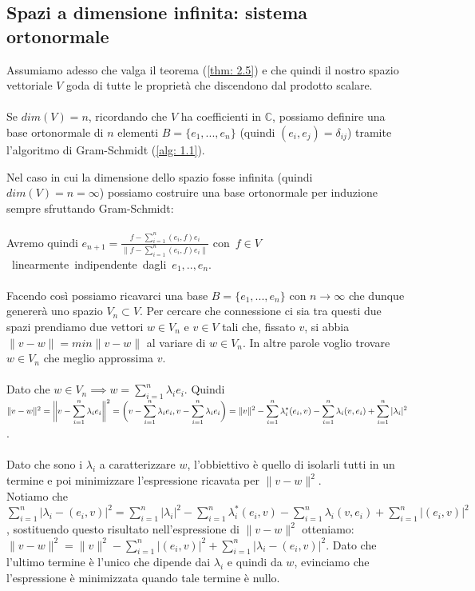 \documentclass[a4paper,12pt]{report}
\begin{document}
\newpage

\subsection{Spazi a dimensione infinita: sistema ortonormale}
Assumiamo adesso che valga il teorema (\ref{thm: 2.5}) e che quindi il nostro spazio vettoriale $V$ goda di tutte le proprietà che discendono dal prodotto scalare.
\\
\\ Se $dim(V)=n$, ricordando che $V$ ha coefficienti in $\mathbb{C}$, possiamo definire una base ortonormale di $n$ elementi $B=\{e_1,...,e_n\}$ (quindi $(e_i,e_j)=\delta_{ij}$) tramite l'algoritmo di Gram-Schmidt (\ref{alg: 1.1}). 

Nel caso in cui la dimensione dello spazio fosse infinita (quindi $dim(V)=n=\infty$) possiamo costruire una base ortonormale per induzione sempre sfruttando Gram-Schmidt:
\\
\\ Avremo quindi $e_{n+1}=\displaystyle\frac{f-\displaystyle\sum_{i=1}^n(e_i,f)e_i}{\bigg\|f-\displaystyle\sum_{i=1}^n(e_i,f)e_i\bigg\|}$ \mbox{con $f\in V$ linearmente indipendente dagli $e_1,..,e_n$}.
\\
\\ Facendo così possiamo ricavarci una base $B=\{e_1,...,e_n\}$ con $n\to \infty$ che dunque genererà uno spazio $V_n \subset V$. Per cercare che connessione ci sia tra questi due spazi prendiamo due vettori $w \in V_n$ e $v \in V$ tali che, fissato $v$, si abbia $\|v-w\|=min\|v-w\|$ al variare di $w\in V_n$. In altre parole voglio trovare $w \in V_n$ che meglio approssima $v$.
\\
\\ Dato che $w \in V_n \implies w=\displaystyle\sum_{i=1}^n\lambda _ie_i$. Quindi $\|v-w\|^2=\bigg\|v-\displaystyle\sum_{i=1}^n\lambda_ie_i\bigg\|^2=
\\\bigg(v-\sum_{i=1}^n\lambda_ie_i,v-\sum_{i=1}^n\lambda_ie_i\bigg)=\|v\|^2-\displaystyle\sum_{i=1}^n\lambda_i^*(e_i,v)-\sum_{i=1}^n\lambda_i(v,e_i)+\sum_{i=1}^n|\lambda_i|^2$.
\\
\\ Dato che sono i $\lambda_i$ a caratterizzare $w$, l'obbiettivo è quello di isolarli tutti in un termine e poi minimizzare l'espressione ricavata per $\|v-w\|^2$.
\\Notiamo che \mbox{$\displaystyle\sum_{i=1}^n|\lambda_i-(e_i,v)|^2=\sum_{i=1}^n|\lambda_i|^2-\sum_{i=1}^n\lambda_i^*(e_i,v)-\sum_{i=1}^n\lambda_i(v,e_i)+\sum_{i=1}^n|(e_i,v)|^2$}, sostituendo questo risultato nell'espressione di $\|v-w\|^2$ otteniamo:
\\$\|v-w\|^2=\|v\|^2-\displaystyle\sum_{i=1}^n|(e_i,v)|^2+\sum_{i=1}^n|\lambda_i-(e_i,v)|^2$. Dato che l'ultimo termine è l'unico che dipende dai $\lambda_i$ e quindi da $w$, evinciamo che l'espressione è minimizzata quando tale termine è nullo.
\end{document}
